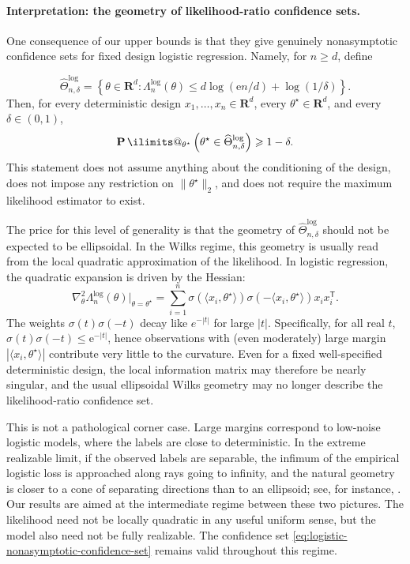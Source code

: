 \documentclass[11pt, letterpaper, hidelinks]{article}
\makeatletter
\newcommand{\R}{\mathbf R}
\newcommand{\e}{\mathrm{e}}
\newcommand{\1}{\mathbf 1}
\renewcommand{\leq}{\leqslant}
\renewcommand{\geq}{\geqslant}
\newcommand{\T}{\mathsf{T}}
\renewcommand{\P}{\operatorname*{\mathbf{P}}\ilimits@}
\theoremstyle{plain}
\theoremstyle{definition}
\newcommand{\thetastar}{\theta^\star}
\makeatother
\begin{document}
\paragraph{Interpretation: the geometry of likelihood-ratio confidence sets.}

One consequence of our upper bounds is that they give genuinely
nonasymptotic confidence sets for fixed design logistic regression. Namely, for
\(n\geq d\), define

\begin{equation}
\label{eq:logistic-nonasymptotic-confidence-set}
\widehat \Theta_{n,\delta}^{\log}
= \left\{ \theta\in\R^d: \Lambda_n^{\log}(\theta) \leq d\log(\e n/d)+\log(1/\delta) \right\}.
\end{equation}
Then, for every deterministic design \(x_1,\ldots,x_n\in\R^d\), every
\(\thetastar\in\R^d\), and every \(\delta\in(0,1)\),
\begin{equation}
\P_{\thetastar}\left(
\thetastar\in
\widehat \Theta_{n,\delta}^{\operatorname{log}}
\right)
\geq 1-\delta .
\end{equation}
This statement does not assume anything about the conditioning of the design,
does not impose any restriction on \(\|\thetastar\|_2\), and does not require
the maximum likelihood estimator to exist.

The price for this level of generality is that the geometry of
\(\widehat \Theta_{n,\delta}^{\operatorname{log}}\) should not be expected to be
ellipsoidal. In the Wilks regime, this geometry is usually read from the local
quadratic approximation of the likelihood. In logistic regression, the
quadratic expansion is driven by the Hessian:
\[
\nabla_\theta^2 \Lambda_n^{\operatorname{log}}(\theta)
\big|_{\theta=\thetastar}
=
\sum_{i=1}^n
\sigma(\langle x_i,\thetastar\rangle)
\sigma(-\langle x_i,\thetastar\rangle)
x_i x_i^\T .
\]
The weights $\sigma(t)\sigma(-t)$ decay like $e^{-|t|}$ for large
$|t|$. Specifically, for all real $t$, $\sigma(t)\sigma(-t)\leq \e^{-|t|}$, hence observations with (even moderately) large margin
$|\langle x_i,\thetastar\rangle|$ contribute very little to the curvature.
Even for a fixed well-specified deterministic design, the local information
matrix may therefore be nearly singular, and the usual ellipsoidal Wilks
geometry may no longer describe the likelihood-ratio confidence set.

This is not a pathological corner case. Large margins correspond to low-noise
logistic models, where the labels are close to deterministic. In the extreme
realizable limit, if the observed labels are separable, the infimum of the
empirical logistic loss is approached along rays going to infinity, and the
natural geometry is closer to a cone of separating directions than to an
ellipsoid; see, for instance,
\cite{AlbertAnderson1984LogisticMLE,Cover1965}. Our results are aimed at the
intermediate regime between these two pictures. The likelihood need not be
locally quadratic in any useful uniform sense, but the model also need not be
fully realizable. The confidence set
\eqref{eq:logistic-nonasymptotic-confidence-set} remains valid throughout this
regime.
\end{document}

